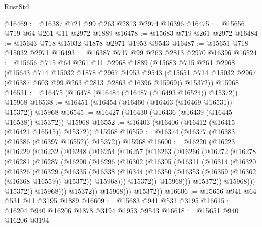 \begin{lexlean}{RustStd}
\begin{coremodule}
@16469 := @16387 @721 @99 @263 @2813 @2974 @16396
@16475 := @15656 @719 @64 @261 @11 @2972 @1889
@16478 := @15683 @719 @261 @2972
@16484 := @15643 @718 @15032 @1878 @2971 @1953 @9543
@16487 := @15651 @718 @15032 @2971
@16493 := @16387 @717 @99 @263 @2813 @2970 @16396
@16524 := @15656
    @715
    @64
    @261
    @11
    @2968
    @1889
    (@15683
      @715
      @261
      @2968
      (@15643
        @714
        @15032
        @1878
        @2967
        @1953
        @9543
        (@15651 @714 @15032 @2967 (@16387 @603 @99 @263 @2813 @2863 @16396 @15969))
        @15372))
    @15968
@16531 := @16475 (@16478 (@16484 (@16487 (@16493 @16524)) @15372)) @15968
@16538 := @16451 (@16454 (@16460 (@16463 (@16469 @16531)) @15372)) @15968
@16545 := @16427 (@16430 (@16436 (@16439 (@16445 @16538)) @15372)) @15968
@16552 := @16403 (@16406 (@16412 (@16415 (@16421 @16545)) @15372)) @15968
@16559 := @16374 (@16377 (@16383 (@16386 (@16397 @16552)) @15372)) @15968
@16600 := @16220
    (@16223
      (@16229
        (@16232
          (@16248
            (@16254
              (@16257
                (@16263
                  (@16266
                    (@16272
                      (@16278
                        (@16281
                          (@16287
                            (@16290
                              (@16296
                                (@16302
                                  (@16305
                                    (@16311
                                      (@16314
                                        (@16320
                                          (@16326
                                            (@16329
                                              (@16335
                                                (@16338
                                                  (@16344
                                                    (@16350
                                                      (@16353
                                                        (@16359 (@16362 (@16368 @16559)) @15372))
                                                      @15968)))
                                                @15372))
                                            @15968)))
                                      @15372))
                                  @15968)))
                            @15372))
                        @15968)))
                  @15372))
              @15968)))
        @15372))
@16606 := @15656 @941 @64 @531 @11 @3195 @1889
@16609 := @15683 @941 @531 @3195
@16615 := @16204 @940 @16206 @1878 @3194 @1953 @9543
@16618 := @15651 @940 @16206 @3194

\end{coremodule}
\end{lexlean}
